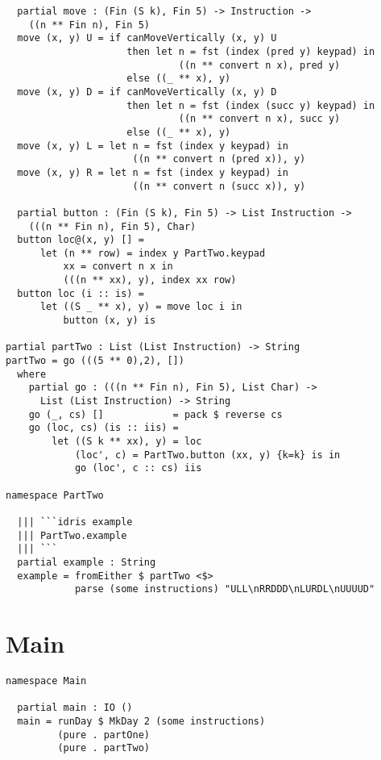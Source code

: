 \newpage

\begin{verbatim}
  partial move : (Fin (S k), Fin 5) -> Instruction ->
    ((n ** Fin n), Fin 5)
  move (x, y) U = if canMoveVertically (x, y) U
                     then let n = fst (index (pred y) keypad) in
                              ((n ** convert n x), pred y)
                     else ((_ ** x), y)
  move (x, y) D = if canMoveVertically (x, y) D
                     then let n = fst (index (succ y) keypad) in
                              ((n ** convert n x), succ y)
                     else ((_ ** x), y)
  move (x, y) L = let n = fst (index y keypad) in
                      ((n ** convert n (pred x)), y)
  move (x, y) R = let n = fst (index y keypad) in
                      ((n ** convert n (succ x)), y)

  partial button : (Fin (S k), Fin 5) -> List Instruction ->
    (((n ** Fin n), Fin 5), Char)
  button loc@(x, y) [] =
      let (n ** row) = index y PartTwo.keypad
          xx = convert n x in
          (((n ** xx), y), index xx row)
  button loc (i :: is) =
      let ((S _ ** x), y) = move loc i in
          button (x, y) is

partial partTwo : List (List Instruction) -> String
partTwo = go (((5 ** 0),2), [])
  where
    partial go : (((n ** Fin n), Fin 5), List Char) ->
      List (List Instruction) -> String
    go (_, cs) []            = pack $ reverse cs
    go (loc, cs) (is :: iis) =
        let ((S k ** xx), y) = loc
            (loc', c) = PartTwo.button (xx, y) {k=k} is in
            go (loc', c :: cs) iis

namespace PartTwo

  ||| ```idris example
  ||| PartTwo.example
  ||| ```
  partial example : String
  example = fromEither $ partTwo <$>
            parse (some instructions) "ULL\nRRDDD\nLURDL\nUUUUD"
\end{verbatim}

\section{Main}\label{main}

\begin{verbatim}
namespace Main

  partial main : IO ()
  main = runDay $ MkDay 2 (some instructions)
         (pure . partOne)
         (pure . partTwo)
\end{verbatim}
